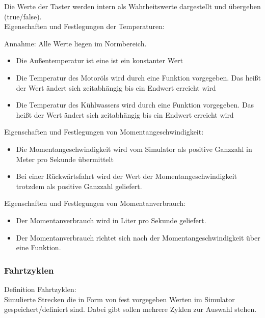\documentclass[a4paper,12pt]{article}
\begin{document}
Die Werte der Taster werden intern als Wahrheitswerte dargestellt und übergeben (true/false).\\

Eigenschaften und Festlegungen der Temperaturen:

Annahme: Alle Werte liegen im Normbereich.

\begin{itemize}

\item Die Außentemperatur ist eine ist ein konstanter Wert
\item Die Temperatur des Motoröls wird durch eine Funktion vorgegeben. Das heißt der Wert ändert sich zeitabhängig bis ein Endwert erreicht wird
\item Die Temperatur des Kühlwassers wird durch eine Funktion vorgegeben. Das heißt der Wert ändert sich zeitabhängig bis ein Endwert erreicht wird

\end{itemize}

Eigenschaften und Festlegungen von Momentangeschwindigkeit:

\begin{itemize}

\item Die Momentangeschwindigkeit wird vom Simulator als positive Ganzzahl in Meter pro Sekunde übermittelt
\item Bei einer Rückwärtsfahrt wird der Wert der Momentangeschwindigkeit trotzdem als positive Ganzzahl geliefert.

\end{itemize}

Eigenschaften und Festlegungen von Momentanverbrauch:

\begin{itemize}

\item Der Momentanverbrauch wird in Liter pro Sekunde geliefert. 
\item Der Momentanverbrauch richtet sich nach der Momentangeschwindigkeit über eine Funktion.

\end{itemize}

\subsubsection{Fahrtzyklen}

Definition Fahrtzyklen:\\

Simulierte Strecken die in Form von fest vorgegeben Werten im Simulator gespeichert/definiert sind.
Dabei gibt sollen mehrere Zyklen zur Auswahl stehen.
\end{document}
